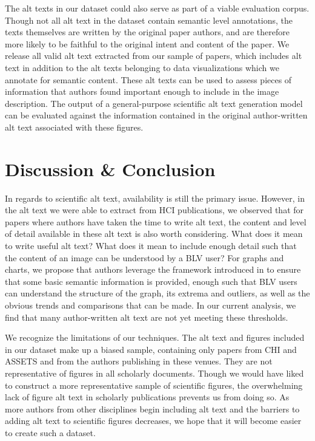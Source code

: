\documentclass[sigconf]{acmart}
\begin{document}
The alt texts in our dataset could also serve as part of a viable evaluation corpus. Though not all alt text in the dataset contain semantic level annotations, the texts themselves are written by the original paper authors, and are therefore more likely to be faithful to the original intent and content of the paper. We release all \numvalidalttext valid alt text extracted from our sample of papers, which includes alt text in addition to the \totalalttext alt texts belonging to data visualizations which we annotate for semantic content. These alt texts can be used to assess pieces of information that authors found important enough to include in the image description. The output of a general-purpose scientific alt text generation model can be evaluated against the information contained in the original author-written alt text associated with these figures.

\section{Discussion \& Conclusion}
\label{sec:discussion}



In regards to scientific alt text, availability is still the primary issue. However, in the alt text we were able to extract from HCI publications, we observed that for papers where authors have taken the time to write alt text, the content and level of detail available in these alt text is also worth considering. What does it mean to write useful alt text? What does it mean to include enough detail such that the content of an image can be understood by a BLV user? For graphs and charts, we propose that authors leverage the framework introduced in \citet{Lundgard2022AccessibleVV} to ensure that some basic semantic information is provided, enough such that BLV users can understand the structure of the graph, its extrema and outliers, as well as the obvious trends and comparisons that can be made. In our current analysis, we find that many author-written alt text are not yet meeting these thresholds.



We recognize the limitations of our techniques. The alt text and figures included in our dataset make up a biased sample, containing only papers from CHI and ASSETS and from the authors publishing in these venues. They are not representative of figures in all scholarly documents. Though we would have liked to construct a more representative sample of scientific figures, the overwhelming lack of figure alt text in scholarly publications prevents us from doing so. As more authors from other disciplines begin including alt text and the barriers to adding alt text to scientific figures decreases, we hope that it will become easier to create such a dataset.
\end{document}
